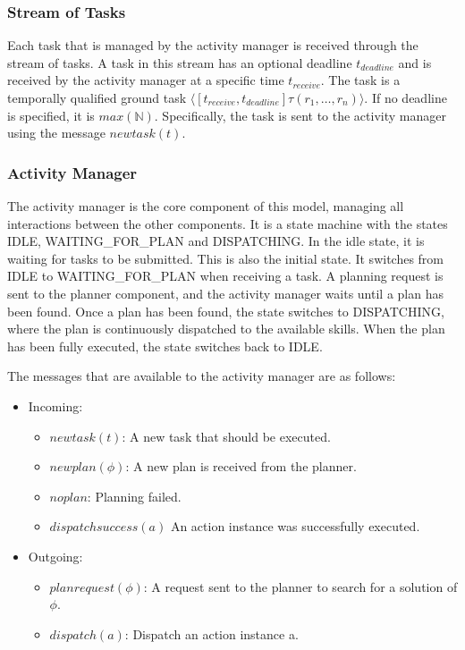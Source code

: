 \subsubsection{Stream of Tasks}

Each task that is managed by the activity manager is received through the stream of tasks.
A task in this stream has an optional deadline $t_{deadline}$ and is received by the activity manager at a specific time $t_{receive}$.
The task is a temporally qualified ground task $\langle[t_{receive},t_{deadline}] \tau(r_1,\dots,r_n)\rangle$.
If no deadline is specified, it is $max(\mathbb{N})$.
Specifically, the task is sent to the activity manager using the message $newtask(t)$.

\subsubsection{Activity Manager}

The activity manager is the core component of this model, managing all interactions between the other components.
It is a state machine with the states IDLE,  WAITING\_FOR\_PLAN and DISPATCHING.
In the idle state, it is waiting for tasks to be submitted.
This is also the initial state.
It switches from IDLE to WAITING\_FOR\_PLAN when receiving a task.
A planning request is sent to the planner component, and the activity manager waits until a plan has been found.
Once a plan has been found, the state switches to DISPATCHING, where the plan is continuously dispatched to the available skills.
When the plan has been fully executed, the state switches back to IDLE.

The messages that are available to the activity manager are as follows:
\begin{itemize}
    \item Incoming:
    \begin{itemize}
        \item $newtask(t)$: A new task that should be executed. 
        \item $newplan(\phi)$: A new plan is received from the planner.
        \item $noplan$: Planning failed.
        \item $dispatchsuccess(a)$ An action instance was successfully executed.
    \end{itemize}
    \item Outgoing:
    \begin{itemize}
        \item $planrequest(\phi)$: A request sent to the planner to search for a solution of $\phi$.
        \item $dispatch(a)$: Dispatch an action instance a.
    \end{itemize}
\end{itemize}

